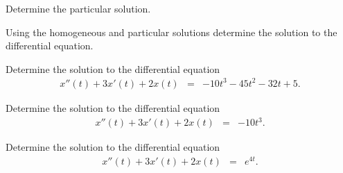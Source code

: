 \begin{problem}
\begin{subproblem}
          \clearpage

        \item Determine the particular solution.
          \vfill

        \item Using the homogeneous and particular solutions determine
          the solution to the differential equation.

          \vfill

      \end{subproblem}

      \clearpage

    \item Determine the solution to the differential equation
      \begin{eqnarray}
        x''(t) + 3x'(t) + 2x(t) & = & -10 t^3 - 45 t^2 - 32 t + 5.
      \end{eqnarray}

      \vfill
      \clearpage


    \item Determine the solution to the differential equation
      \begin{eqnarray}
        x''(t) + 3x'(t) + 2x(t) & = & -10 t^3.
      \end{eqnarray}

      \vfill
      \clearpage

    \item Determine the solution to the differential equation
      \begin{eqnarray}
        x''(t) + 3x'(t) + 2x(t) & = & e^{4t}.
      \end{eqnarray}

      \vfill


      \clearpage


\end{problem}

